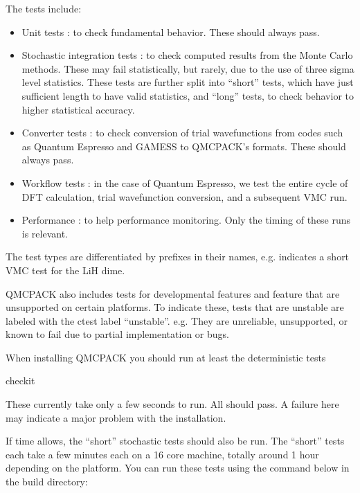 The tests include:
\begin{itemize}
\item Unit tests : to check fundamental behavior. These should always pass.
\item Stochastic integration tests : to check computed results from
  the Monte Carlo methods. These may fail statistically, but rarely,
  due to the use of three sigma level statistics. These tests are
  further split into ``short'' tests, which have just sufficient
  length to have valid statistics, and ``long'' tests, to check
  behavior to higher statistical accuracy.
\item Converter tests : to check conversion of trial wavefunctions
  from codes such as Quantum Espresso and GAMESS to QMCPACK's
  formats. These should always pass.
\item Workflow tests : in the case of Quantum Espresso, we test the
  entire cycle of DFT calculation, trial wavefunction conversion, and
  a subsequent VMC run.  
\item Performance : to help performance monitoring. Only the timing of
  these runs is relevant.  
\end{itemize}


The test types are differentiated by prefixes in their names,
e.g.  indicates a short VMC test
for the LiH dime. 

QMCPACK also includes tests for developmental features and feature
that are unsupported on certain platforms. To indicate these, tests
that are unstable are labeled with the ctest label
``unstable''. e.g. They are unreliable, unsupported, or known to fail
due to partial implementation or bugs.

When installing QMCPACK you should run at least the deterministic
tests

\begin{shade}
checkit
\end{shade}

These currently take only a few seconds to run. All should pass. A
failure here may indicate a major problem with the installation.

If time allows, the ``short'' stochastic tests should also be run.
The ``short'' tests each take a few minutes each on a 16
core machine, totally around 1 hour depending on the platform. You can run these tests using the command below in the
build directory:


